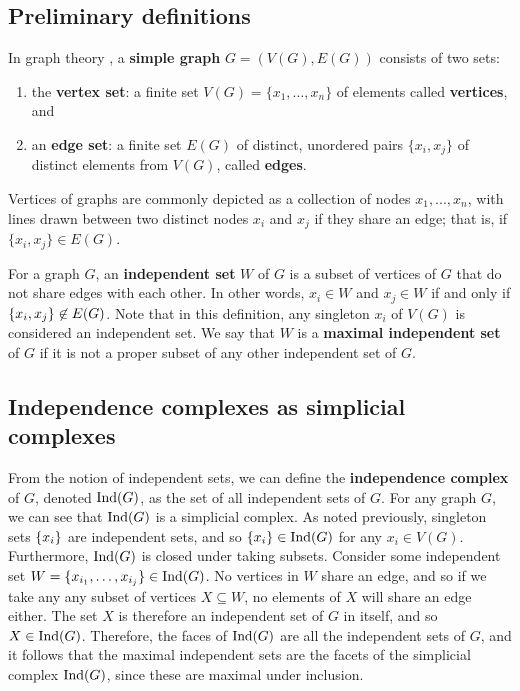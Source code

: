 \subsection{Preliminary definitions}
In graph theory \cite{Wilson2010}, a \textbf{simple graph} $G=(V(G), E(G))$  consists of two sets: 

\begin{enumerate}
	\item the \textbf{vertex set}: a finite set $V(G) = \{ x_1, \dots , x_n \}$ of elements called \textbf{vertices}, and
	\item an \textbf{edge set}: a finite set $E(G)$ of distinct, unordered pairs $\{ x_i, x_j \}$ of distinct elements from $V(G)$, called \textbf{edges}.
\end{enumerate}

Vertices of graphs are commonly depicted as a collection of nodes $x_1, ... , x_n$, with lines drawn between two distinct nodes $x_i$ and $x_j$ if they share an edge; that is, if $\{x_i, x_j\} \in E(G)$. 

For a graph $G$, an \textbf{independent set} $W$ of $G$ is a subset of vertices of $G$ that do not share edges with each other. In other words, $x_i \in W$ and $x_j \in W$ if and only if $\{ x_i, x_j \} \not \in E(G)$. Note that in this definition, any singleton $x_i$ of $V(G)$ is considered an independent set. We say that $W$ is a \textbf{maximal independent set}  of $G$ if it is not a proper subset of any other independent set of $G$. 

\subsection{Independence complexes as simplicial complexes}
From the notion of independent sets, we can define the \textbf{independence complex} of $G$, denoted $\textrm{Ind}(G)$, as the set of all independent sets of $G$. For any graph $G$, we can see that $\textrm{Ind}(G)$ is a simplicial complex. As noted previously, singleton sets $\{ x_i \}$ are independent sets, and so $\{ x_i \} \in \textrm{Ind}(G)$ for any $x_i \in V(G)$. Furthermore, $\textrm{Ind}(G)$ is closed under taking subsets. Consider some independent set $W = \{ x_{i_1}, \dots, x_{i_j} \} \in \textrm{Ind}(G)$. No vertices in $W$ share an edge, and so if we take any any subset of vertices $X \subseteq W$, no elements of $X$ will share an edge either. The set $X$ is therefore an independent set of $G$ in itself, and so $X \in \textrm{Ind}(G)$. Therefore, the faces of $\textrm{Ind}(G)$ are all the independent sets of $G$, and it follows that the maximal independent sets are the facets of the simplicial complex $\textrm{Ind}(G)$, since these are maximal under inclusion. 

